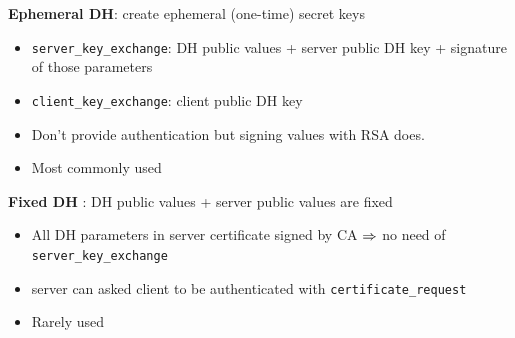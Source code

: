 \documentclass[english, leagacyboxes, nologo]{latex4ei/latex4ei_sheet}
\begin{document}
{    \textbf{Ephemeral DH}: create ephemeral (one-time) secret keys
    \begin{itemize}
      \item \texttt{server\_key\_exchange}: DH public values + server public DH key + signature of those parameters
      \item \texttt{client\_key\_exchange}: client public DH key
      \item Don't provide authentication but signing values with RSA does.
      \item Most commonly used
    \end{itemize}

    \textbf{Fixed DH} : DH public values + server public values are fixed
    \begin{itemize}
      \item All DH parameters in server certificate signed by CA $\Rightarrow$ no need of \texttt{server\_key\_exchange}
      \item server can asked client to be authenticated with \texttt{certificate\_request}
      \item Rarely used
    \end{itemize}
  }
\end{document}

